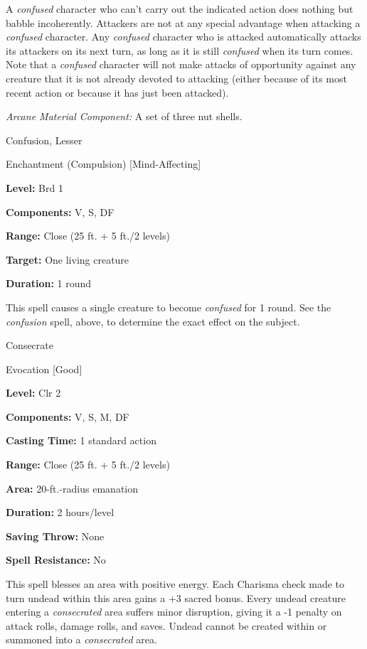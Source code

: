 \documentclass{article}
\begin{document}
A \textit{confused }character who can't carry out the indicated action does nothing 
but babble incoherently. Attackers are not at any special advantage when attacking 
a \textit{confused }character. Any \textit{confused }character who is attacked 
automatically attacks its attackers on its next turn, as long as it is still \textit{confused 
}when its turn comes. Note that a \textit{confused }character will not make attacks 
of opportunity against any creature that it is not already devoted to attacking 
(either because of its most recent action or because it has just been attacked).

\textit{Arcane Material Component: }A set of three nut shells.

\vspace{12pt}
Confusion, Lesser

Enchantment (Compulsion) [Mind-Affecting]

\textbf{Level:} Brd 1

\textbf{Components:} V, S, DF

\textbf{Range:} Close (25 ft. + 5 ft./2 levels)

\textbf{Target:} One living creature

\textbf{Duration:} 1 round

This spell causes a single creature to become \textit{confused }for 1 round. See 
the \textit{confusion }spell, above, to determine the exact effect on the subject.

\vspace{12pt}
Consecrate

Evocation [Good]

\textbf{Level:} Clr 2

\textbf{Components:} V, S, M, DF

\textbf{Casting Time:} 1 standard action

\textbf{Range:} Close (25 ft. + 5 ft./2 levels)

\textbf{Area:} 20-ft.-radius emanation

\textbf{Duration:} 2 hours/level

\textbf{Saving Throw:} None

\textbf{Spell Resistance:} No

This spell blesses an area with positive energy. Each Charisma check made to turn 
undead within this area gains a +3 sacred bonus. Every undead creature entering 
a \textit{consecrated }area suffers minor disruption, giving it a -1 penalty on 
attack rolls, damage rolls, and saves. Undead cannot be created within or summoned 
into a \textit{consecrated }area.
\end{document}
